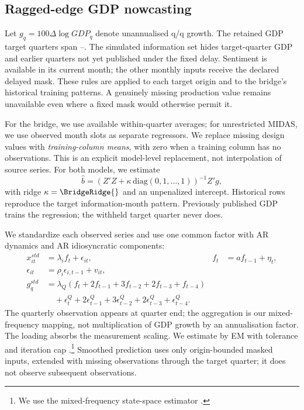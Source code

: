 \subsection{Ragged-edge GDP nowcasting}
Let $g_q=100\Delta\log GDP_q$ denote unannualised q/q growth. The retained GDP target quarters span \GDPStart{}--\GDPEnd{}. The simulated information set hides target-quarter GDP and earlier quarters not yet published under the fixed delay. Sentiment is available in its current month; the other monthly inputs receive the declared delayed mask. These rules are applied to each target origin and to the bridge's historical training patterns. A genuinely missing production value remains unavailable even where a fixed mask would otherwise permit it.

For the bridge, we use available within-quarter averages; for unrestricted MIDAS, we use observed month slots as separate regressors. We replace missing design values with \emph{training-column means}, with zero when a training column has no observations. This is an explicit model-level replacement, not interpolation of source series. For both models, we estimate
\begin{equation}
 \widehat b=(Z'Z+\kappa\,\mathrm{diag}(0,1,\ldots,1))^{-1}Z'g,
\end{equation}
with ridge $\kappa=\BridgeRidge{}$ and an unpenalized intercept. Historical rows reproduce the target information-month pattern. Previously published GDP trains the regression; the withheld target quarter never does.

We standardize each observed series and use one common factor with AR dynamics and AR idiosyncratic components:
\begin{align}
 x_{it}^{std}&=\lambda_i f_t+\epsilon_{it},& f_t&=a f_{t-1}+\eta_t,\\
 \epsilon_{it}&=\rho_i\epsilon_{i, t-1}+v_{it},&&\\
 g_q^{std}&=\lambda_Q(f_t+2f_{t-1}+3f_{t-2}+2f_{t-3}+f_{t-4})
\nonumber\\
 &\quad+\epsilon_t^Q+2\epsilon_{t-1}^Q+3\epsilon_{t-2}^Q+2\epsilon_{t-3}^Q+\epsilon_{t-4}^Q.
\end{align}
The quarterly observation appears at quarter end; the aggregation is our mixed-frequency mapping, not multiplication of GDP growth by an annualisation factor. The loading absorbs the measurement scaling. We estimate by EM with tolerance \EMTolerance{} and iteration cap \EMCap{}.\footnote{We use the mixed-frequency state-space estimator .} Smoothed prediction uses only origin-bounded masked inputs, extended with missing observations through the target quarter; it does not observe subsequent observations.

